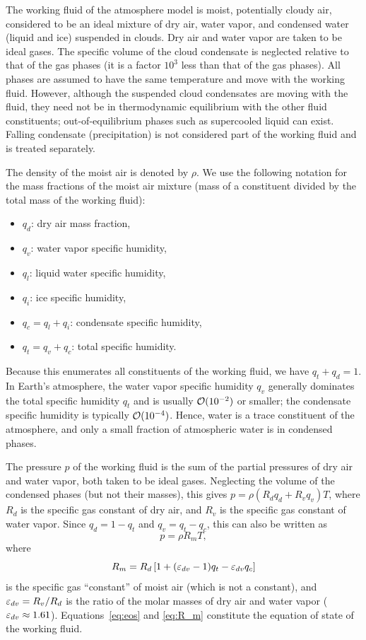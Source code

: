 \documentclass{article}
\begin{document}
The working fluid of the atmosphere model is moist, potentially cloudy air, considered to be an ideal mixture of dry air, water vapor, and condensed water (liquid and ice) suspended in clouds. Dry air and water vapor are taken to be ideal gases. The specific volume of the cloud condensate is neglected relative to that of the gas phases (it is a  factor $10^{3}$ less than that of the gas phases). All phases are assumed to have the same temperature and move with the working fluid. However, although the suspended cloud condensates are moving with the fluid, they need not be in thermodynamic equilibrium with the other fluid constituents; out-of-equilibrium phases such as supercooled liquid can exist. Falling condensate (precipitation) is not considered part of the working fluid and is treated separately.

The density of the moist air is denoted by $\rho$. We use the following notation for the mass fractions of the moist air mixture (mass of a constituent divided by the total mass of the working fluid):
\begin{itemize}
\item $q_d$: dry air mass fraction,
\item $q_v$: water vapor specific humidity,
\item $q_l$: liquid water specific humidity,
\item $q_i$: ice specific humidity,
\item $q_c = q_l + q_i$: condensate specific humidity,
\item $q_t = q_v + q_c$: total specific humidity.
\end{itemize}
Because this enumerates all constituents of the working fluid, we have $q_t + q_d = 1$. In Earth's atmosphere, the water vapor specific humidity $q_v$ generally dominates the total specific humidity $q_t$ and is usually $\mathcal{O}(10^{-2})$ or smaller; the condensate specific humidity is typically $\mathcal{O}(10^{-4})$. Hence, water is a trace constituent of the atmosphere, and only a small fraction of atmospheric water is in condensed phases. 

The pressure $p$ of the working fluid is the sum of the partial pressures of dry air and water vapor, both taken to be ideal gases. Neglecting the volume of the condensed phases (but not their masses), this gives $p = \rho (R_d q_d + R_v q_v) T$, where $R_d$ is the specific gas constant of dry air, and $R_v$ is the specific gas constant of water vapor. Since $q_d = 1-q_t$ and $q_v = q_t - q_c$, this can also be written as
\begin{equation}
    p = \rho R_m T,
\label{eq:eos}
\end{equation}
where
\begin{equation}
    R_m = R_d \left[1 + (\varepsilon_{dv}-1)q_t - \varepsilon_{dv} q_c\right]
\label{eq:R_m}
\end{equation}
is the specific gas ``constant'' of moist air (which is not a constant), and $\varepsilon_{dv} = R_v/R_d$ is the ratio of the molar masses of dry air and water vapor ($\varepsilon_{dv} \approx 1.61$). Equations~\eqref{eq:eos} and \eqref{eq:R_m} constitute the equation of state of the working fluid.
\end{document}
